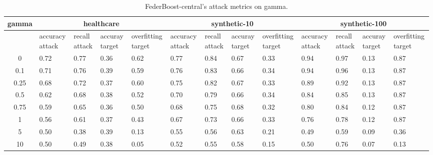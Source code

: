 \begin{table*}[]\centering
\begin{tabular}{|c| *{12}{m{1.0cm}|}}
\hline\rowcolor{gray!50}
\cellcolor{gray!80} gamma & \multicolumn{4}{c|}{healthcare} & \multicolumn{4}{c|}{synthetic-10} & \multicolumn{4}{c|}{synthetic-100}\\\hline 
& accuracy attack & recall attack & accuray target & overfitting target & accuracy attack & recall attack & accuray target & overfitting target & accuracy attack & recall attack & accuray target & overfitting target\\\hline
0 & 0.72 & 0.77 & 0.36 & 0.62 & 0.77 & 0.84 & 0.67 & 0.33 & 0.94 & 0.97 & 0.13 & 0.87\\ \hline
0.1 & 0.71 & 0.76 & 0.39 & 0.59 & 0.76 & 0.83 & 0.66 & 0.34 & 0.94 & 0.96 & 0.13 & 0.87\\ \hline
0.25 & 0.68 & 0.72 & 0.37 & 0.60 & 0.75 & 0.82 & 0.67 & 0.33 & 0.89 & 0.92 & 0.13 & 0.87\\ \hline
0.5 & 0.62 & 0.68 & 0.38 & 0.52 & 0.70 & 0.79 & 0.66 & 0.34 & 0.84 & 0.85 & 0.13 & 0.87\\ \hline
0.75 & 0.59 & 0.65 & 0.36 & 0.50 & 0.68 & 0.75 & 0.68 & 0.32 & 0.80 & 0.84 & 0.12 & 0.87\\ \hline
1 & 0.56 & 0.61 & 0.37 & 0.43 & 0.67 & 0.73 & 0.66 & 0.33 & 0.76 & 0.78 & 0.12 & 0.87\\ \hline
5 & 0.50 & 0.38 & 0.39 & 0.13 & 0.55 & 0.56 & 0.63 & 0.21 & 0.49 & 0.59 & 0.09 & 0.36\\ \hline
10 & 0.50 & 0.49 & 0.38 & 0.05 & 0.52 & 0.55 & 0.58 & 0.15 & 0.50 & 0.76 & 0.07 & 0.13\\ \hline
\end{tabular} 
\caption{FederBoost-central's attack metrics on gamma.}
\label{tab:experiment1_gamma}
\end{table*}
